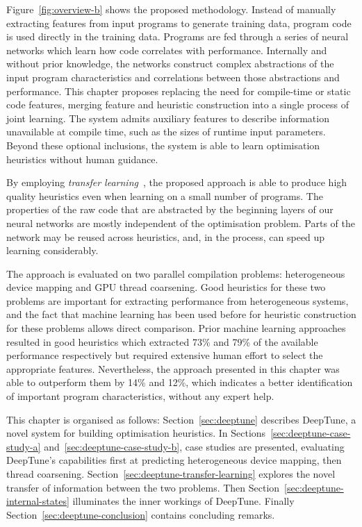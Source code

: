 Figure~\ref{fig:overview-b} shows the proposed methodology. Instead of manually extracting features from input programs to generate training data, program code is used directly in the training data. Programs are fed through a series of neural networks which learn how code correlates with performance. Internally and without prior knowledge, the networks construct complex abstractions of the input program characteristics and correlations between those abstractions and performance. This chapter proposes replacing the need for compile-time or static code features, merging feature and heuristic construction into a single process of joint learning. The system admits auxiliary features to describe information unavailable at compile time, such as the sizes of runtime input parameters. Beyond these optional inclusions, the system is able to learn optimisation heuristics without human guidance.

By employing \emph{transfer learning}~\cite{Yosinski2014}, the proposed approach is able to produce high quality heuristics even when learning on a small number of programs. The properties of the raw code that are abstracted by the beginning layers of our neural networks are mostly independent of the optimisation problem. Parts of the network may be reused across heuristics, and, in the process, can speed up learning considerably.

The approach is evaluated on two parallel compilation problems: heterogeneous device mapping and GPU thread coarsening. Good heuristics for these two problems are important for extracting performance from heterogeneous systems, and the fact that machine learning has been used before for heuristic construction for these problems allows direct comparison. Prior machine learning approaches resulted in good heuristics which extracted 73\% and 79\% of the available performance respectively but required extensive human effort to select the appropriate features. Nevertheless, the approach presented in this chapter was able to outperform them by 14\% and 12\%, which indicates a better identification of important program characteristics, without any expert help.

This chapter is organised as follows: Section~\ref{sec:deeptune} describes DeepTune, a novel system for building optimisation heuristics. In Sections~\ref{sec:deeptune-case-study-a} and~\ref{sec:deeptune-case-study-b}, case studies are presented, evaluating DeepTune's capabilities first at predicting heterogeneous device mapping, then thread coarsening. Section~\ref{sec:deeptune-transfer-learning} explores the novel transfer of information between the two problems. Then Section~\ref{sec:deeptune-internal-states} illuminates the inner workings of DeepTune. Finally Section~\ref{sec:deeptune-conclusion} contains concluding remarks.

